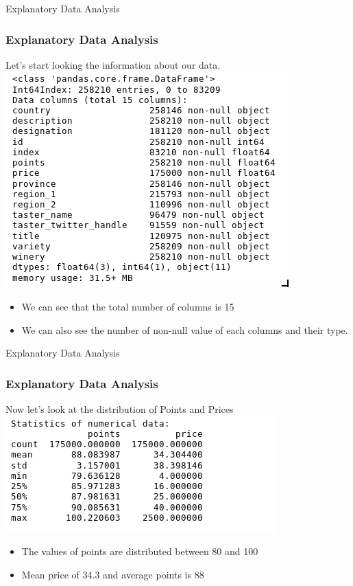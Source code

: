 \documentclass[11pt]{beamer}
\begin{document}
	
		
	\begin{frame}{Explanatory Data Analysis}
	\frametitle{Explanatory Data Analysis}
	
	Let's start looking the information about our data. \\
	
	\centering
	\includegraphics[width=0.59\linewidth]{infoD}	
	 \begin{itemize}
		\item We can see that the total number of columns is 15
		
		\item We can also see the number of non-null value of each columns and their type.
	\end{itemize} 
	
\end{frame}	
	
		\begin{frame}{Explanatory Data Analysis}
			\frametitle{Explanatory Data Analysis}
			
			Now let's look at the distribution of Points and Prices \\
			
			\centering
			\includegraphics[width=0.65\linewidth]{statisticalNumericalD}	 \begin{itemize}
				\item The values of points are distributed between 80 and 100

				\item Mean price of 34.3 and average points is 88
				
			\end{itemize} 
		
		\end{frame}	
	
\end{document}
